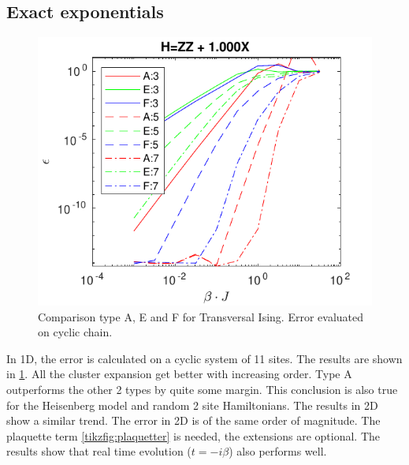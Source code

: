 \documentclass[twocolumn]{article}
\newcounter{a}
\newcounter{b}
\begin{document}
\subsection{Exact exponentials}
\begin{figure}[h!]
    \center
    \includegraphics[width=\linewidth]{../Figuren/benchmarking/t_ising_small.pdf}
    \caption{Comparison type A, E and F for Transversal Ising. Error evaluated on cyclic chain. }
    \label{fig:benchmark:tising}
\end{figure}

In 1D, the error is calculated on a cyclic system of 11 sites. The results are shown in \cref{fig:benchmark:tising}. All the cluster expansion get better with increasing order. Type A outperforms the other 2 types by quite some margin. This conclusion is also true for the Heisenberg model and random 2 site Hamiltonians. The results in 2D show a similar trend. The error in 2D is of the same order of magnitude. The plaquette term \cref{tikzfig:plaquetter} is needed, the extensions are optional. The results show that real time evolution ($t = - i \beta$) also performs well.
\end{document}
